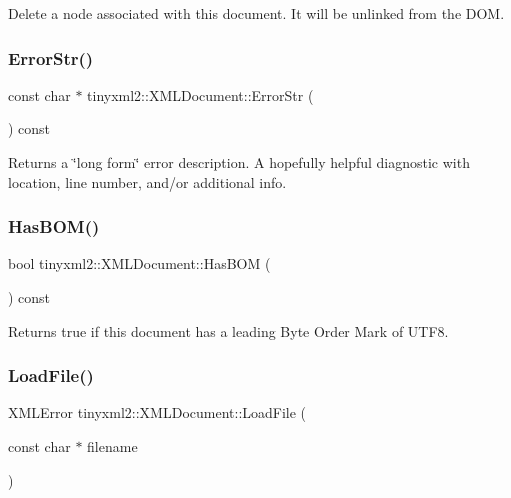 Delete a node associated with this document. It will be unlinked from the D\+OM. \mbox{\label{classtinyxml2_1_1_x_m_l_document_ae97fff2402a0d01e0509c430b37996b3}} 
\subsubsection{\texorpdfstring{Error\+Str()}{ErrorStr()}}
{\footnotesize\ttfamily const char $\ast$ tinyxml2\+::\+X\+M\+L\+Document\+::\+Error\+Str (\begin{DoxyParamCaption}{ }\end{DoxyParamCaption}) const}

Returns a \char`\"{}long form\char`\"{} error description. A hopefully helpful diagnostic with location, line number, and/or additional info. \mbox{\label{classtinyxml2_1_1_x_m_l_document_a33fc5d159db873a179fa26338adb05bd}} 
\subsubsection{\texorpdfstring{Has\+B\+O\+M()}{HasBOM()}}
{\footnotesize\ttfamily bool tinyxml2\+::\+X\+M\+L\+Document\+::\+Has\+B\+OM (\begin{DoxyParamCaption}{ }\end{DoxyParamCaption}) const\hspace{0.3cm}{\ttfamily [inline]}}

Returns true if this document has a leading Byte Order Mark of U\+T\+F8. \mbox{\label{classtinyxml2_1_1_x_m_l_document_a2ebd4647a8af5fc6831b294ac26a150a}} 
\subsubsection{\texorpdfstring{Load\+File()}{LoadFile()}\hspace{0.1cm}{\footnotesize\ttfamily [1/2]}}
{\footnotesize\ttfamily X\+M\+L\+Error tinyxml2\+::\+X\+M\+L\+Document\+::\+Load\+File (\begin{DoxyParamCaption}\item[{const char $\ast$}]{filename }\end{DoxyParamCaption})}

